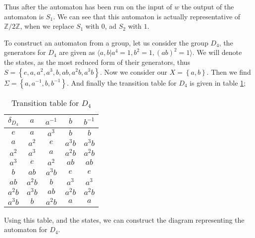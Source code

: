 \documentclass[10pt]{amsart}
\theoremstyle{definition}
\newcommand{\Z}{\mathbb{Z}}
\begin{document}
Thus after the automaton has been run on the input of $w$ the output of the
automaton is $S_1$. We can see that this automaton is actually representative
of $\Z/2\Z$, when we replace $S_1$ with $0$, ad $S_2$ with $1$.

To construct an automaton from a group, let us consider the group $D_4$, the
generators for $D_4$ are given as $\langle a,b | a^4=1, b^2=1,
(ab)^2=1\rangle$. We will denote the states, as the most reduced form of their
generators, thus $S=\left\{e,a,a^2,a^3,b,ab,a^2b,a^3b\right\}$. Now we consider
our $X=\left\{a,b\right\}$. Then we find
$\Sigma=\left\{a,a^{-1},b,b^{-1}\right\}$. And finally the transition table for
$D_4$ is given in table \ref{tab:d4};

\begin{table}[htpb]
  \centering
  \caption{Transition table for $D_4$}
  \label{tab:d4}
  \begin{tabular}{c||c|c|c|c}
    $\delta_{D_4}$ & $a$ & $a^{-1}$ & $b$ & $b^{-1}$\\
    \hline\hline
    $e$ & $a$ & $a^3$ & $b$ & $b$\\
    $a$ & $a^2$ & $e$ & $a^3b$ & $a^3b$\\
    $a^2$ & $a^3$ & $a$ & $a^2b$ & $a^2b$\\
    $a^3$ & $e$ & $a^2$ & $ab$ & $ab$\\
    $b$ & $ab$ & $a^3b$ & $e$ & $e$\\
    $ab$ & $a^2b$ & $b$ & $a^3$ & $a^3$\\
    $a^2b$ & $a^3b$ & $ab$ & $a^2b$ & $a^2b$\\
    $a^3b$ & $b$ & $a^2b$ & $a$ & $a$\\
  \end{tabular}
\end{table}

Using this table, and the states, we can construct the diagram representing the
automaton for $D_4$.
\end{document}
